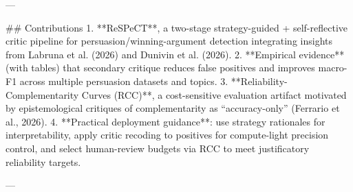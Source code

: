 ---

## Contributions  
1. **ReSPeCT**, a two-stage strategy-guided + self-reflective critic pipeline for persuasion/winning-argument detection integrating insights from Labruna et al. (2026) and Dunivin et al. (2026).  
2. **Empirical evidence** (with tables) that secondary critique reduces false positives and improves macro-F1 across multiple persuasion datasets and topics.  
3. **Reliability-Complementarity Curves (RCC)**, a cost-sensitive evaluation artifact motivated by epistemological critiques of complementarity as “accuracy-only” (Ferrario et al., 2026).  
4. **Practical deployment guidance**: use strategy rationales for interpretability, apply critic recoding to positives for compute-light precision control, and select human-review budgets via RCC to meet justificatory reliability targets.

---